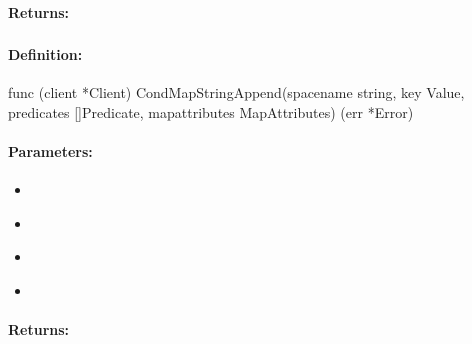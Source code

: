 \paragraph{Returns:}


\pagebreak
\subsubsection{}
\label{api:Go:CondMapStringAppend}


\paragraph{Definition:}
\begin{gocode}
func (client *Client) CondMapStringAppend(spacename string, key Value, predicates []Predicate, mapattributes MapAttributes) (err *Error)
\end{gocode}

\paragraph{Parameters:}
\begin{itemize}[noitemsep]
\item {}\\

\item {}\\

\item {}\\

\item {}\\

\end{itemize}

\paragraph{Returns:}


\pagebreak
\subsubsection{}
\label{api:Go:GroupMapStringAppend}


